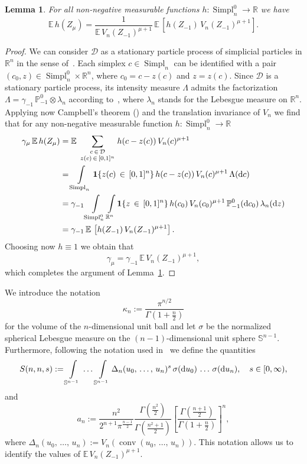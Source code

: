 \documentclass[10pt]{amsart}
\newtheorem{lemm}[theo]{Lemma}\newtheorem{prop}[theo]{Proposition}\newtheorem{coro}[theo]{Corollary}\newtheorem{conj}[theo]{Conjecture}
\theoremstyle{definition}\newtheorem{defi}[theo]{Definition}\newtheorem{rema}[theo]{Remark}\newtheorem{exam}[theo]{Example}\newtheorem{exem}[theo]{Example}\newtheorem{nota}[theo]{Notation}
\newcommand{\Sp}{\mathbb S}
\newcommand{\R}{\mathbb{R}}
\newcommand{\EE}{\mathbb{E}\,}
\newcommand{\PP}{\mathbb{P}}
\newcommand{\dd}{{\rm d}}
\newcommand{\dscr}{\mathcal{D}}
\DeclareMathOperator{\Simpl}{Simpl}
\newcommand{\conv}{\mathop{\mathrm{conv}}\nolimits}
\newcommand{\tatop}[2]{\genfrac{}{}{0pt}{1}{#1}{#2}}
\begin{document}
\begin{lemm}\label{lem:LinkWeightedTypical}
For all non-negative measurable functions $h:\Simpl_n^0\to\R$ we have
\[
\EE h(Z_\mu) = \frac{1}{\EE V_n(Z_{-1})^{\mu+1}}\,\EE\left[h(Z_{-1})\,V_n(Z_{-1})^{\mu+1}\right].
\]
\end{lemm}
\begin{proof}
We can consider $\dscr$ as a stationary particle process of simplicial particles in $\R^n$ in the sense of~\cite[Chapter~4]{SW08}. Each simplex $c\in\Simpl_n$ can be identified with a pair $(c_0,z)\in\Simpl_n^0\times\R^n$, where $c_0=c-z(c)$ and $z=z(c)$. Since $\dscr$ is a stationary particle process, its intensity measure $\Lambda$ admits the factorization $\Lambda=\gamma_{-1}\,\PP_{-1}^0\otimes\lambda_n$ according to~\cite[Theorem~4.1.1]{SW08}, where $\lambda_n$ stands for the Lebesgue measure on $\R^n$. Applying now Campbell's theorem (\cite[Theorem~3.1.2]{SW08}) and the translation invariance of $V_n$ we find that for any non-negative measurable function $h:\Simpl_n^0\to\R$
\begin{align*}
\gamma_\mu\,\EE h(Z_\mu) &= \EE\sum_{\tatop{c\,\in\,\dscr}{z(c)\,\in\,[0,1]^n}}h(c-z(c))\,V_n(c)^{\mu+1}\\
&=\int\limits_{\Simpl_n}{\bf 1}\{z(c)\,\in\,[0,1]^n\}\,h(c-z(c))\,V_n(c)^{\mu+1}\,\Lambda(\dd c)\\
&=\gamma_{-1}\int\limits_{\Simpl_n^0}\int\limits_{\R^n}{\bf 1}\{z\,\in\,[0,1]^n\}\,h(c_0)\,V_n(c_0)^{\mu+1}\,\PP_{-1}^0(\dd c_0)\,\lambda_n(\dd z)\\
&=\gamma_{-1}\,\EE\left[h(Z_{-1})\,V_n(Z_{-1})^{\mu+1}\right].
\end{align*}
Choosing now $h\equiv 1$ we obtain that
\[
\gamma_\mu = \gamma_{-1}\,\EE V_n(Z_{-1})^{\mu+1},
\]
which completes the argument of Lemma~\ref{lem:LinkWeightedTypical}.
\end{proof}

We introduce the notation
\[
\kappa_n:=\frac{\pi^{n/2}}{\Gamma(1+\frac{n}{2})}
\]
for the volume of the $n$-dimensional unit ball and let $\sigma$ be the normalized spherical Lebesgue measure on the $(n-1)$-dimensional unit sphere $\Sp^{n-1}$. Furthermore, following the notation used in~\cite[p.~302]{SW08} we define the quantities
\[
S(n,n,s) := \int\limits_{\Sp^{n-1}}\,\ldots\,\int\limits_{\Sp^{n-1}}\Delta_n(u_0,\,\ldots,\,u_n)^{s}\,\sigma(\dd u_0)\,\ldots\,\sigma(\dd u_n),\quad s\in[0,\infty),
\]
and
\[
a_n:=\frac{n^2}{2^{n+1}\pi^{\frac{n-1}{2}}}\frac{\Gamma\left(\frac{n^2}{2}\right)}{\Gamma\left(\frac{n^2+1}{2}\right)}\left[\frac{\Gamma\left(\frac{n+1}{2}\right)}{\Gamma\left(1+\frac{n}{2}\right)}\right]^n,
\]
where $\Delta_n(u_0,\,\ldots,\,u_n):=V_n(\conv(u_0,\,\ldots,\,u_n))$. This notation allows us to identify the values of $\EE V_n(Z_{-1})^{\mu+1}$.
\end{document}
